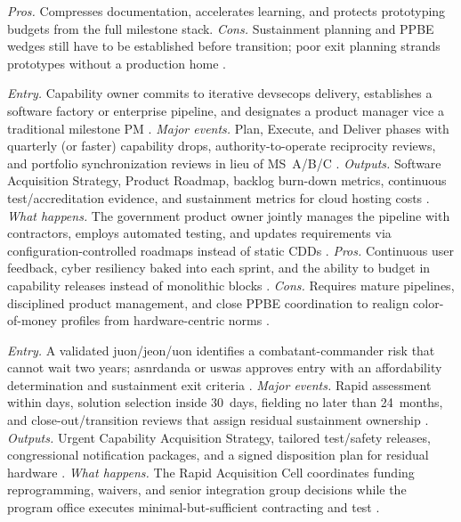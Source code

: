 \documentclass[../main.tex]{subfiles}
\begin{document}
\begin{description}[style=nextline,labelsep=0.5em,font=\bfseries]
    \textit{Pros.} Compresses documentation, accelerates learning, and protects prototyping budgets from the full milestone stack.
    \textit{Cons.} Sustainment planning and PPBE wedges still have to be established before transition; poor exit planning strands prototypes without a production home \autocite{DoDI5000-80}.
  \item[Software Acquisition Pathway.]
    \textit{Entry.} Capability owner commits to iterative \ac{devsecops} delivery, establishes a software factory or enterprise pipeline, and designates a product manager vice a traditional milestone PM \autocite{DoDI5000-87}.
    \textit{Major events.} Plan, Execute, and Deliver phases with quarterly (or faster) capability drops, authority-to-operate reciprocity reviews, and portfolio synchronization reviews in lieu of MS~A/B/C \autocite{DoDI5000-87}.
    \textit{Outputs.} Software Acquisition Strategy, Product Roadmap, backlog burn-down metrics, continuous test/accreditation evidence, and sustainment metrics for cloud hosting costs \autocite{DoDI5000-87}.
    \textit{What happens.} The government product owner jointly manages the pipeline with contractors, employs automated testing, and updates requirements via configuration-controlled roadmaps instead of static CDDs \autocite{DoDI5000-87}.
    \textit{Pros.} Continuous user feedback, cyber resiliency baked into each sprint, and the ability to budget in capability releases instead of monolithic blocks \autocite{DoDI5000-87}.
    \textit{Cons.} Requires mature pipelines, disciplined product management, and close PPBE coordination to realign color-of-money profiles from hardware-centric norms \autocite{DoDI5000-87}.
  \item[Urgent Capability Acquisition.]
    \textit{Entry.} A validated \ac{juon}/\ac{jeon}/\ac{uon} identifies a combatant-commander risk that cannot wait two years; \ac{asnrdanda} or \ac{uswas} approves entry with an affordability determination and sustainment exit criteria \autocite{CJCSI3470-01H,DoDI5000-81}.
    \textit{Major events.} Rapid assessment within days, solution selection inside 30~days, fielding no later than 24~months, and close-out/transition reviews that assign residual sustainment ownership \autocite{DoDI5000-81}.
    \textit{Outputs.} Urgent Capability Acquisition Strategy, tailored test/safety releases, congressional notification packages, and a signed disposition plan for residual hardware \autocite{DoDI5000-81}.
    \textit{What happens.} The Rapid Acquisition Cell coordinates funding reprogramming, waivers, and senior integration group decisions while the program office executes minimal-but-sufficient contracting and test \autocite{DoDI5000-81}.

\end{description}
\end{document}
